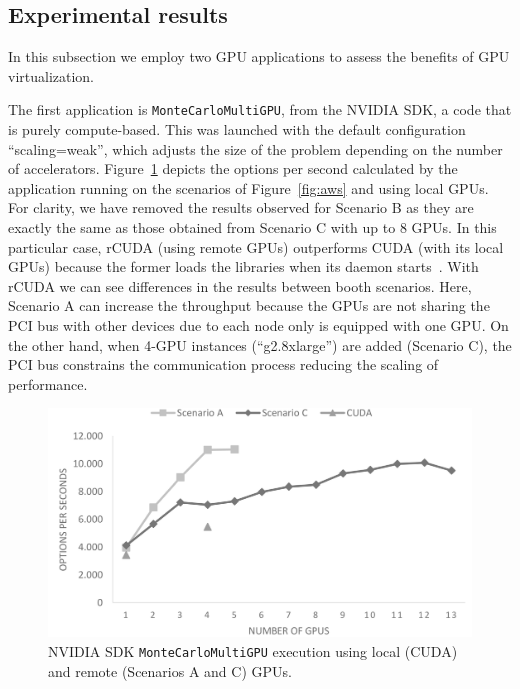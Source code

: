 \documentclass[a4paper,twoside]{article}
\begin{document}
\subsection{Experimental results}
In this subsection we employ two GPU applications to assess the benefits of GPU virtualization.

The first application is {\tt MonteCarloMultiGPU}, from the NVIDIA SDK, a code that is purely compute-based. 
This was launched with the default configuration ``scaling=weak'', which adjusts the size of the problem depending on the number of accelerators.
Figure~\ref{fig:mont-opt} depicts the options per second calculated by the application running on the scenarios of Figure~\ref{fig:aws} and using local GPUs. 
For clarity, we have removed the results observed for Scenario B as they are exactly the same as those obtained from Scenario C with up to 8 GPUs. 
In this particular case, rCUDA (using remote GPUs) outperforms CUDA (with its local GPUs) because the former loads the libraries when its daemon starts~\cite{tonithesis}.
With rCUDA we can see differences in the results between booth scenarios. 
Here, Scenario A can increase the throughput because the GPUs are not sharing the PCI bus with other devices due to each node only is equipped with one GPU.
On the other hand, when 4-GPU instances (``g2.8xlarge'') are added (Scenario C), the PCI bus constrains the communication process reducing the scaling of performance.
\begin{figure}[htb]
  \centering
  \includegraphics[width=\linewidth]{images/mont.pdf}
  \caption{NVIDIA SDK {\tt MonteCarloMultiGPU} execution using local (CUDA) and remote (Scenarios A and C) GPUs.}
  \label{fig:mont-opt}
\end{figure}
\end{document}
